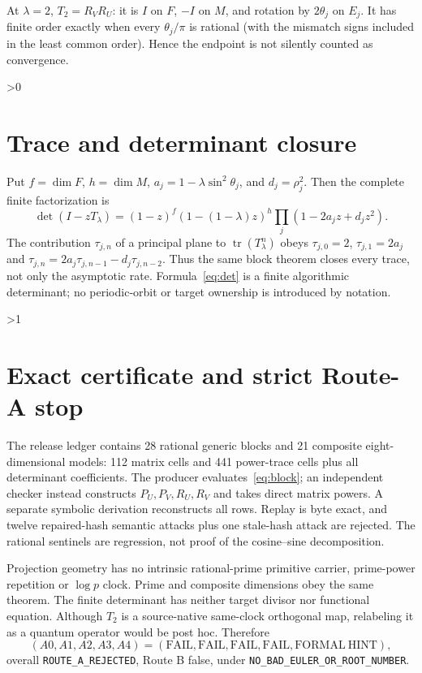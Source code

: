 \documentclass[9pt]{extarticle}
\begin{document}
At $\lambda=2$, $T_2=R_VR_U$: it is $I$ on $F$, $-I$ on $M$, and rotation by
$2\theta_j$ on $E_j$.  It has finite order exactly when every
$\theta_j/\pi$ is rational (with the mismatch signs included in the least
common order).  Hence the endpoint is not silently counted as convergence.

\ifnum\CRevisionRound>0
\section{Trace and determinant closure}
Put $f=\dim F$, $h=\dim M$,
$a_j=1-\lambda\sin^2\theta_j$, and $d_j=\rho_j^2$.  Then the complete finite
factorization is
\begin{equation}\label{eq:det}
 \det(I-zT_\lambda)=(1-z)^f(1-(1-\lambda)z)^h
 \prod_j(1-2a_jz+d_jz^2).
\end{equation}
The contribution $\tau_{j,n}$ of a principal plane to
$\operatorname{tr}(T_\lambda^n)$ obeys
$\tau_{j,0}=2$, $\tau_{j,1}=2a_j$ and
$\tau_{j,n}=2a_j\tau_{j,n-1}-d_j\tau_{j,n-2}$.  Thus the same block theorem
closes every trace, not only the asymptotic rate.  Formula~\eqref{eq:det} is a
finite algorithmic determinant; no periodic-orbit or target ownership is
introduced by notation.
\fi

\ifnum\CRevisionRound>1
\section{Exact certificate and strict Route-A stop}
The release ledger contains 28 rational generic blocks and 21 composite
eight-dimensional models: 112 matrix cells and 441 power-trace cells plus all
determinant coefficients.  The producer evaluates~\eqref{eq:block}; an
independent checker instead constructs $P_U,P_V,R_U,R_V$ and takes direct
matrix powers.  A separate symbolic derivation reconstructs all rows.  Replay
is byte exact, and twelve repaired-hash semantic attacks plus one stale-hash
attack are rejected.  The rational sentinels are regression, not proof of the
cosine--sine decomposition.

Projection geometry has no intrinsic rational-prime primitive carrier,
prime-power repetition or $\log p$ clock.  Prime and composite dimensions obey
the same theorem.  The finite determinant has neither target divisor nor
functional equation.  Although $T_2$ is a source-native same-clock orthogonal
map, relabeling it as a quantum operator would be post hoc.  Therefore
\[
 (A0,A1,A2,A3,A4)=(\mathrm{FAIL},\mathrm{FAIL},\mathrm{FAIL},
 \mathrm{FAIL},\mathrm{FORMAL\ HINT}),
\]
overall \texttt{ROUTE\_A\_REJECTED}, Route B false, under
\texttt{NO\_BAD\_EULER\_OR\_ROOT\_NUMBER}.
\end{document}
